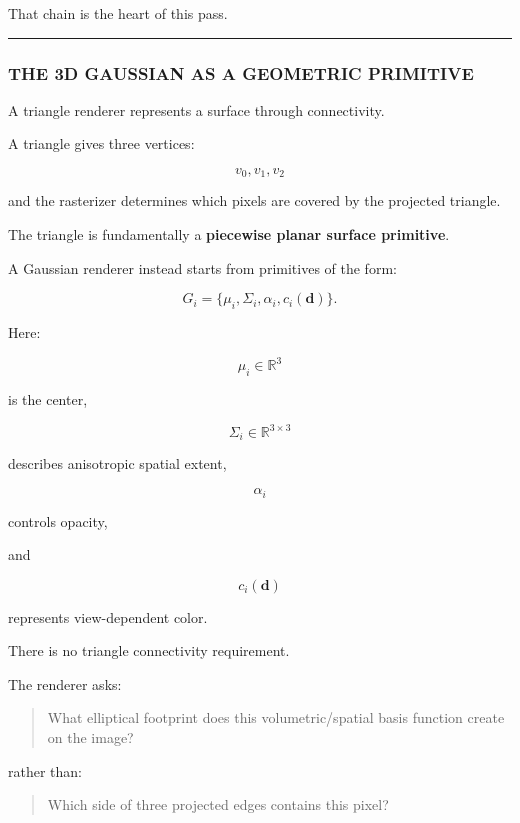 That chain is the heart of this pass.

\begin{center}\rule{0.5\linewidth}{0.5pt}\end{center}

\subsubsection{THE 3D GAUSSIAN AS A GEOMETRIC PRIMITIVE}\label{04-visual-computing-ii-ch037-the-3d-gaussian-as-a-geometric-primitive}

\hypertarget{04-visual-computing-ii-ch037-the-3d-gaussian-as-a-geometric-primitive}{}

A triangle renderer represents a surface through connectivity.

A triangle gives three vertices:

\[
v_0,v_1,v_2
\]

and the rasterizer determines which pixels are covered by the projected triangle.

The triangle is fundamentally a \textbf{piecewise planar surface primitive}.

A Gaussian renderer instead starts from primitives of the form:

\[
G_i=
\{
\mu_i,
\Sigma_i,
\alpha_i,
c_i(\mathbf d)
\}.
\]

Here:

\[
\mu_i\in\mathbb R^3
\]

is the center,

\[
\Sigma_i\in\mathbb R^{3\times3}
\]

describes anisotropic spatial extent,

\[
\alpha_i
\]

controls opacity,

and

\[
c_i(\mathbf d)
\]

represents view-dependent color.

There is no triangle connectivity requirement.

The renderer asks:

\begin{quote}
What elliptical footprint does this volumetric/spatial basis function create on the image?
\end{quote}

rather than:

\begin{quote}
Which side of three projected edges contains this pixel?
\end{quote}


